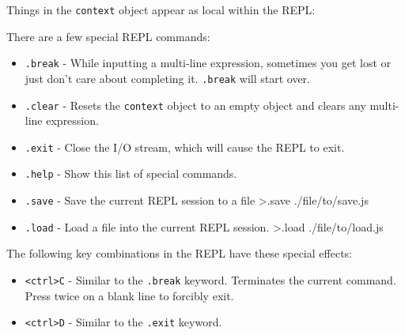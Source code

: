 Things in the \texttt{context} object appear as local within the REPL:

\begin{Shaded}
\begin{Highlighting}[]
\end{Highlighting}
\end{Shaded}

There are a few special REPL commands:

\begin{itemize}
\item
  \texttt{.break} - While inputting a multi-line expression, sometimes
  you get lost or just don't care about completing it. \texttt{.break}
  will start over.
\item
  \texttt{.clear} - Resets the \texttt{context} object to an empty
  object and clears any multi-line expression.
\item
  \texttt{.exit} - Close the I/O stream, which will cause the REPL to
  exit.
\item
  \texttt{.help} - Show this list of special commands.
\item
  \texttt{.save} - Save the current REPL session to a file
  \textgreater{}.save ./file/to/save.js
\item
  \texttt{.load} - Load a file into the current REPL session.
  \textgreater{}.load ./file/to/load.js
\end{itemize}

The following key combinations in the REPL have these special effects:

\begin{itemize}
\item
  \texttt{\textless{}ctrl\textgreater{}C} - Similar to the
  \texttt{.break} keyword. Terminates the current command. Press twice
  on a blank line to forcibly exit.
\item
  \texttt{\textless{}ctrl\textgreater{}D} - Similar to the
  \texttt{.exit} keyword.
\end{itemize}
